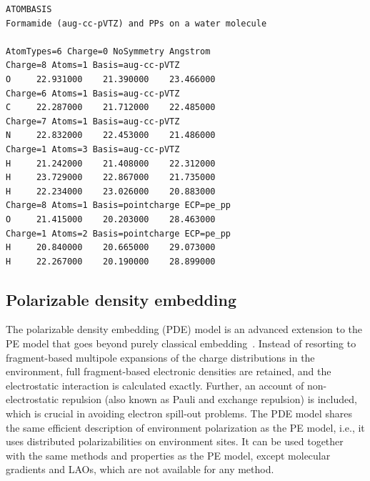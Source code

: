 \begin{verbatim}
ATOMBASIS
Formamide (aug-cc-pVTZ) and PPs on a water molecule

AtomTypes=6 Charge=0 NoSymmetry Angstrom
Charge=8 Atoms=1 Basis=aug-cc-pVTZ
O     22.931000    21.390000    23.466000
Charge=6 Atoms=1 Basis=aug-cc-pVTZ
C     22.287000    21.712000    22.485000
Charge=7 Atoms=1 Basis=aug-cc-pVTZ
N     22.832000    22.453000    21.486000
Charge=1 Atoms=3 Basis=aug-cc-pVTZ
H     21.242000    21.408000    22.312000
H     23.729000    22.867000    21.735000
H     22.234000    23.026000    20.883000
Charge=8 Atoms=1 Basis=pointcharge ECP=pe_pp
O     21.415000    20.203000    28.463000
Charge=1 Atoms=2 Basis=pointcharge ECP=pe_pp
H     20.840000    20.665000    29.073000
H     22.267000    20.190000    28.899000
\end{verbatim}

\subsection{Polarizable density embedding}\label{subsec:pde}
The polarizable density embedding (PDE) model is an advanced extension to the PE model
that goes beyond purely classical embedding~\cite{pde1,pde2,pde3}.
Instead of resorting to fragment-based multipole expansions of the charge distributions
in the environment, full fragment-based electronic densities are retained, and the
electrostatic interaction is calculated exactly.
Further, an account of non-electrostatic repulsion (also known as Pauli and
exchange repulsion) is included, which is crucial in avoiding electron
spill-out problems.
The PDE model shares the same efficient description of environment polarization as
the PE model, i.e., it uses distributed polarizabilities on environment sites.
It can be used together with the same methods and properties as the PE model,
except molecular gradients and LAOs, which are not available for any method.

